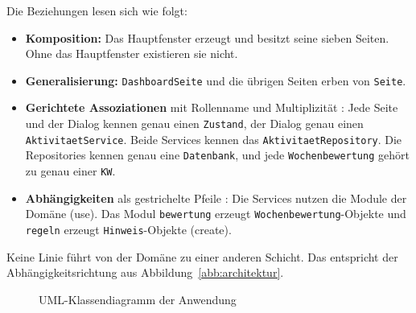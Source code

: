 Die Beziehungen lesen sich wie folgt:
\begin{itemize}
  \item \textbf{Komposition:} Das Hauptfenster erzeugt und besitzt seine sieben Seiten. Ohne das Hauptfenster existieren sie nicht.
  \item \textbf{Generalisierung:} \texttt{DashboardSeite} und die übrigen Seiten erben von \texttt{Seite}.
  \item \textbf{Gerichtete Assoziationen} mit Rollenname und Multiplizität \parencite[S.~201]{omg2017uml}: Jede Seite und der Dialog kennen genau einen \texttt{Zustand}, der Dialog genau einen \texttt{AktivitaetService}. Beide Services kennen das \texttt{AktivitaetRepository}. Die Repositories kennen genau eine \texttt{Datenbank}, und jede \texttt{Wochenbewertung} gehört zu genau einer \texttt{KW}.
  \item \textbf{Abhängigkeiten} als gestrichelte Pfeile \parencite[S.~39]{omg2017uml}: Die Services nutzen die Module der Domäne (\guillemotleft use\guillemotright). Das Modul \texttt{bewertung} erzeugt \texttt{Wochenbewertung}-Objekte und \texttt{regeln} erzeugt \texttt{Hinweis}-Objekte (\guillemotleft create\guillemotright).
\end{itemize}
Keine Linie führt von der Domäne zu einer anderen Schicht. Das entspricht der Abhängigkeitsrichtung aus Abbildung~\ref{abb:architektur}.

\begin{figure}[H]
  \caption{UML-Klassendiagramm der Anwendung}\label{abb:klassendiagramm}
  \centering
\end{figure}
